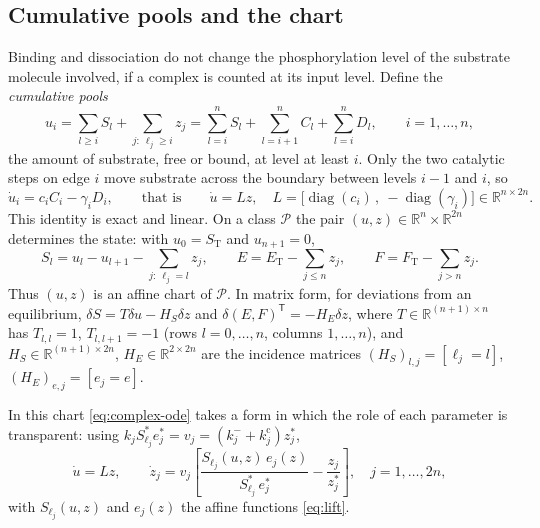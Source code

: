 \documentclass[11pt,a4paper]{article}
\theoremstyle{plain}
\theoremstyle{definition}
\theoremstyle{remark}
\newcommand{\R}{\mathbb R}
\newcommand{\T}{\mathsf T}
\newcommand{\cP}{\mathcal P}
\newcommand{\ET}{E_{\mathrm T}}
\newcommand{\FT}{F_{\mathrm T}}
\newcommand{\ST}{S_{\mathrm T}}
\DeclareMathOperator{\diag}{diag}
\begin{document}
\subsection{Cumulative pools and the chart}
Binding and dissociation do not change the phosphorylation level of the substrate molecule involved, if a complex is counted at its input level. Define the \emph{cumulative pools}
\begin{equation}\label{eq:pools}
 u_i=\sum_{l\ge i}S_l+\sum_{j:\ \ell_j\ge i}z_j
    =\sum_{l=i}^{n}S_l+\sum_{l=i+1}^{n}C_l+\sum_{l=i}^{n}D_l,\qquad i=1,\dots,n ,
\end{equation}
the amount of substrate, free or bound, at level at least $i$. Only the two catalytic steps on edge $i$ move substrate across the boundary between levels $i-1$ and $i$, so
\begin{equation}\label{eq:pooldot}
 \dot u_i=c_iC_i-\gamma_iD_i ,\qquad\text{that is}\qquad \dot u=Lz,\quad L=\bigl[\diag(c_i)\,,\ -\diag(\gamma_i)\bigr]\in\R^{n\times2n}.
\end{equation}
This identity is exact and linear. On a class $\cP$ the pair $(u,z)\in\R^n\times\R^{2n}$ determines the state: with $u_0=\ST$ and $u_{n+1}=0$,
\begin{equation}\label{eq:lift}
 S_l=u_l-u_{l+1}-\sum_{j:\ \ell_j=l}z_j,\qquad E=\ET-\sum_{j\le n}z_j,\qquad F=\FT-\sum_{j>n}z_j .
\end{equation}
Thus $(u,z)$ is an affine chart of $\cP$. In matrix form, for deviations from an equilibrium, $\delta S=T\delta u-H_S\delta z$ and $\delta(E,F)^{\T}=-H_E\delta z$, where $T\in\R^{(n+1)\times n}$ has $T_{l,l}=1$, $T_{l,l+1}=-1$ (rows $l=0,\dots,n$, columns $1,\dots,n$), and $H_S\in\R^{(n+1)\times2n}$, $H_E\in\R^{2\times2n}$ are the incidence matrices $(H_S)_{l,j}=[\ell_j=l]$, $(H_E)_{e,j}=[e_j=e]$.

In this chart \eqref{eq:complex-ode} takes a form in which the role of each parameter is transparent: using $k_jS^*_{\ell_j}e_j^*=v_j=(k_j^-+k_j^{\mathrm c})z_j^*$,
\begin{equation}\label{eq:chartfield}
 \dot u=Lz,\qquad
 \dot z_j=v_j\left[\frac{S_{\ell_j}(u,z)\,e_j(z)}{S_{\ell_j}^*\,e_j^*}-\frac{z_j}{z_j^*}\right],\quad j=1,\dots,2n ,
\end{equation}
with $S_{\ell_j}(u,z)$ and $e_j(z)$ the affine functions \eqref{eq:lift}.
\end{document}
